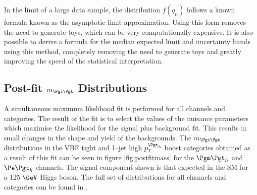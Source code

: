 In the limit of a large data sample, the distribution $f(q_{\mu})$ follows a known formula
\cite{Cowan:2011aa} known as the asymptotic limit approximation. Using this form
removes the need to generate toys, which can be very computationally expensive.
It is also possible to derive a formula for
the median expected limit and uncertainty bands using this method, completely
removing the need to generate toys and greatly improving the speed of the
statistical interpretation.

\subsection{Post-fit $m_{\Pgt\Pgt}$ Distributions}

A simultaneous maximum likelihood fit is performed for all channels and
categories. The result of the fit is to select the values of the nuisance
parameters which maximise the likelihood for the signal plus background fit.
This results in small changes in the shape and yield of the backgrounds. The
$m_{\Pgt\Pgt}$ distributions in the VBF tight and 1--jet high $\pt^{\Pgt_{h}}$
boost categories obtained as a result of this fit can be seen in
figure \ref{fig:postfitmass} for the $\mutau$ and $\etau$ channels. The signal
component shown is that expected in the \ac{SM} for a 125 $\GeV$ Higgs boson. The full set
of distributions for all channels and categories can be found in
\cite{HIG-13-004}.

